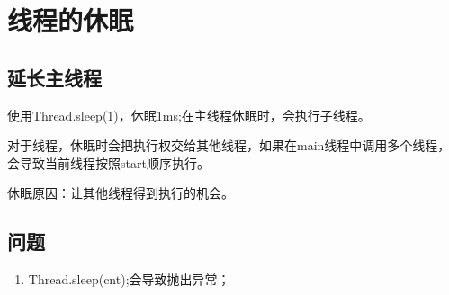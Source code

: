 \section{线程的休眠}
\subsection{延长主线程}
使用Thread.sleep(1)，休眠1ms;在主线程休眠时，会执行子线程。
\par 对于线程，休眠时会把执行权交给其他线程，如果在main线程中调用多个线程，
会导致当前线程按照start顺序执行。
\par 休眠原因：让其他线程得到执行的机会。
\subsection{问题}
\begin{enumerate}
	\item Thread.sleep(cnt);会导致抛出异常；
\end{enumerate}
